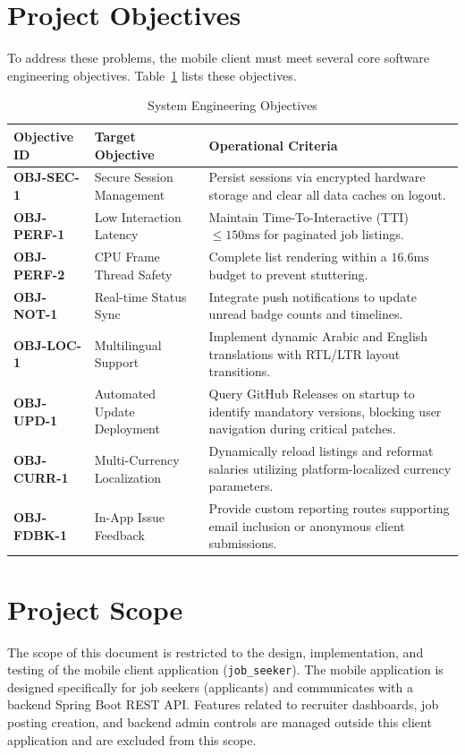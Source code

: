 \section{Project Objectives}
To address these problems, the mobile client must meet several core software engineering objectives. Table~\ref{tab:project_objectives} lists these objectives.

\begin{table}[htbp]
\centering
\caption{System Engineering Objectives}
\label{tab:project_objectives}
\begin{tabular}{|l|p{5cm}|p{6cm}|}
\hline
\textbf{Objective ID} & \textbf{Target Objective} & \textbf{Operational Criteria} \\ \hline
\textbf{OBJ-SEC-1} & Secure Session Management & Persist sessions via encrypted hardware storage and clear all data caches on logout. \\ \hline
\textbf{OBJ-PERF-1} & Low Interaction Latency & Maintain Time-To-Interactive (TTI) $\le 150\text{ms}$ for paginated job listings. \\ \hline
\textbf{OBJ-PERF-2} & CPU Frame Thread Safety & Complete list rendering within a $16.6\text{ms}$ budget to prevent stuttering. \\ \hline
\textbf{OBJ-NOT-1} & Real-time Status Sync & Integrate push notifications to update unread badge counts and timelines. \\ \hline
\textbf{OBJ-LOC-1} & Multilingual Support & Implement dynamic Arabic and English translations with RTL/LTR layout transitions. \\ \hline
\textbf{OBJ-UPD-1} & Automated Update Deployment & Query GitHub Releases on startup to identify mandatory versions, blocking user navigation during critical patches. \\ \hline
\textbf{OBJ-CURR-1} & Multi-Currency Localization & Dynamically reload listings and reformat salaries utilizing platform-localized currency parameters. \\ \hline
\textbf{OBJ-FDBK-1} & In-App Issue Feedback & Provide custom reporting routes supporting email inclusion or anonymous client submissions. \\ \hline
\end{tabular}
\end{table}

\section{Project Scope}
The scope of this document is restricted to the design, implementation, and testing of the mobile client application (\texttt{job\_seeker}). The mobile application is designed specifically for job seekers (applicants) and communicates with a backend Spring Boot REST API. Features related to recruiter dashboards, job posting creation, and backend admin controls are managed outside this client application and are excluded from this scope.

